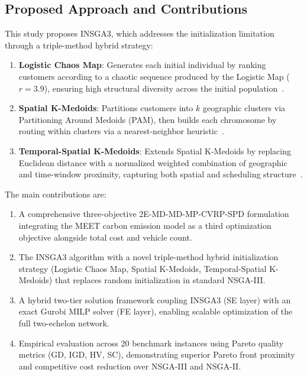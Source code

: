 \documentclass[11pt, a4paper]{article}
\numberwithin{equation}{section}
\begin{document}
\subsection{Proposed Approach and Contributions}

This study proposes INSGA3, which addresses the initialization limitation
through a triple-method hybrid strategy:
\begin{enumerate}
  \item \textbf{Logistic Chaos Map}: Generates each initial individual by
        ranking customers according to a chaotic sequence produced by the
        Logistic Map ($r=3.9$), ensuring high structural diversity across
        the initial population~\cite{may1976,ren2024}.
  \item \textbf{Spatial K-Medoids}: Partitions customers into $k$ geographic
        clusters via Partitioning Around Medoids (PAM), then builds each
        chromosome by routing within clusters via a nearest-neighbor
        heuristic~\cite{kaufman1990,wang2022collaborative}.
  \item \textbf{Temporal-Spatial K-Medoids}: Extends Spatial K-Medoids by
        replacing Euclidean distance with a normalized weighted combination
        of geographic and time-window proximity, capturing both spatial
        and scheduling structure~\cite{ren2024}.
\end{enumerate}

The main contributions are:
\begin{enumerate}
  \item A comprehensive three-objective 2E-MD-MD-MP-CVRP-SPD formulation
        integrating the MEET carbon emission model as a third optimization
        objective alongside total cost and vehicle count.
  \item The INSGA3 algorithm with a novel triple-method hybrid initialization
        strategy (Logistic Chaos Map, Spatial K-Medoids, Temporal-Spatial
        K-Medoids) that replaces random initialization in standard NSGA-III.
  \item A hybrid two-tier solution framework coupling INSGA3 (SE layer) with
        an exact Gurobi MILP solver (FE layer), enabling scalable optimization
        of the full two-echelon network.
  \item Empirical evaluation across 20 benchmark instances using Pareto quality
        metrics (GD, IGD, HV, SC), demonstrating superior Pareto front
        proximity and competitive cost reduction over NSGA-III and NSGA-II\@.
\end{enumerate}
\end{document}
